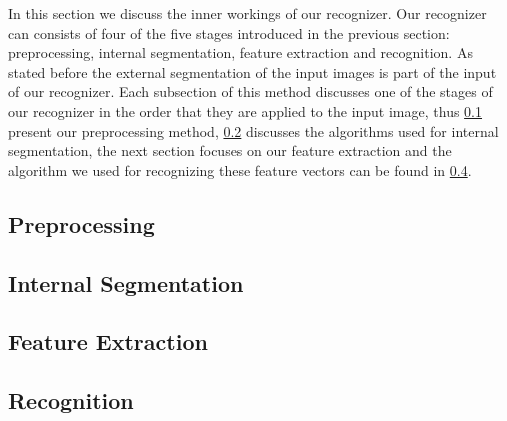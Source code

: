 In this section we discuss the inner workings of our recognizer. Our recognizer can consists of four of the five stages introduced in the previous section: preprocessing, internal segmentation, feature extraction and recognition. As stated before the external segmentation of the input images is part of the input of our recognizer. Each subsection of this method discusses one of the stages of our recognizer in the order that they are applied to the input image, thus \cref{ss:methods:preprocessing} present our preprocessing method, \cref{ss:methods:characterSegmentation} discusses the algorithms used for internal segmentation, the next section focuses on our feature extraction and the algorithm we used for recognizing these feature vectors can be found in \cref{ss:methods:machineLearing}.

\subsection{Preprocessing}
\label{ss:methods:preprocessing}


\subsection{Internal Segmentation}
\label{ss:methods:characterSegmentation}


\subsection{Feature Extraction}
\label{ss:methods:featureExtraction}


\subsection{Recognition}
\label{ss:methods:machineLearing}
